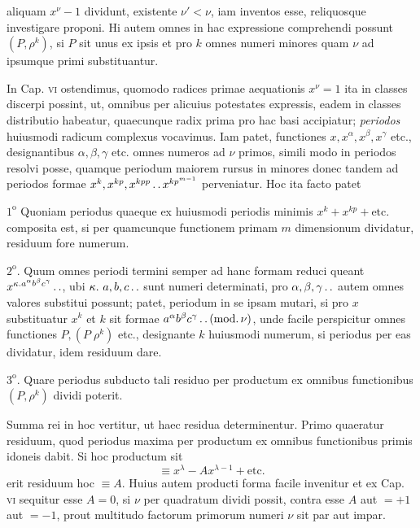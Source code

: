 %
aliquam $x^\nu-1$ dividunt, existente $\nu'<\nu$, iam inventos esse, reliquosque investigare proponi. Hi autem omnes in hac expressione comprehendi possunt $(P,\rho^k)$, si $P$ sit unus ex ipsis et pro $k$ omnes numeri minores quam $\nu$ ad ipsumque primi substituantur.

In Cap. \textsc{vi} ostendimus, quomodo radices primae aequationis $x^\nu=1$ ita in classes discerpi possint, ut, omnibus per alicuius potestates expressis, eadem in classes distributio habeatur, quaecunque radix prima pro hac basi accipiatur; \emph{periodos} huiusmodi radicum complexus vocavimus. Iam patet, functiones $x,x^\alpha,x^\beta,x^\gamma$ etc., designantibus $\alpha,\beta,\gamma$ etc. omnes numeros ad $\nu$ primos, simili modo in periodos resolvi posse, quamque periodum maiorem rursus in minores donec tandem ad periodos formae $x^k,x^{kp},x^{kpp}\mathinner{.\,.} x^{kp^{m-1}}$ perveniatur. Hoc ita facto patet

$1^{\mathrm{o}}$ Quoniam periodus quaeque ex huiusmodi periodis minimis $x^k+x^{kp}+\text{etc.}$ composita est, si per quamcunque functionem primam $m$ dimensionum dividatur, residuum fore numerum.

$2^{\mathrm{o}}$. Quum omnes periodi termini semper ad hanc formam reduci queant $x^{\kappa\mathbin{.} a^\alpha b^\beta c^\gamma}\mathinner{.\,.}$, ubi $\kappa.\ a,b,c\dotstwo$ sunt numeri determinati, pro $\alpha,\beta,\gamma\mathinner{.\,.}$ autem omnes valores substitui possunt; patet, periodum in se ipsam mutari, si pro $x$ substituatur $x^k$ et $k$ sit formae $a^\alpha b^\beta c^\gamma\mathinner{.\,.}(\mathrm{mod.}\,\nu)$, unde facile perspicitur omnes functiones $P,(P\;\rho^k)$ etc., designante $k$ huiusmodi numerum, si periodus per eas dividatur, idem residuum dare.

$3^{\mathrm{o}}$. Quare periodus subducto tali residuo per productum ex omnibus functionibus $(P,\rho^k)$ dividi poterit.

Summa rei in hoc vertitur, ut haec residua determinentur. Primo quaeratur residuum, quod periodus maxima per productum ex omnibus functionibus primis idoneis dabit. Si hoc productum sit
\[
\equiv x^\lambda-Ax^{\lambda-1}+\text{etc.}
\]
erit residuum hoc $\equiv A$. Huius autem producti forma facile invenitur et ex Cap. \textsc{vi} sequitur esse $A=0$, si $\nu$ per quadratum dividi possit, contra esse $A$ aut $=+1$ aut $=-1$, prout multitudo factorum primorum numeri $\nu$ sit par aut impar.

